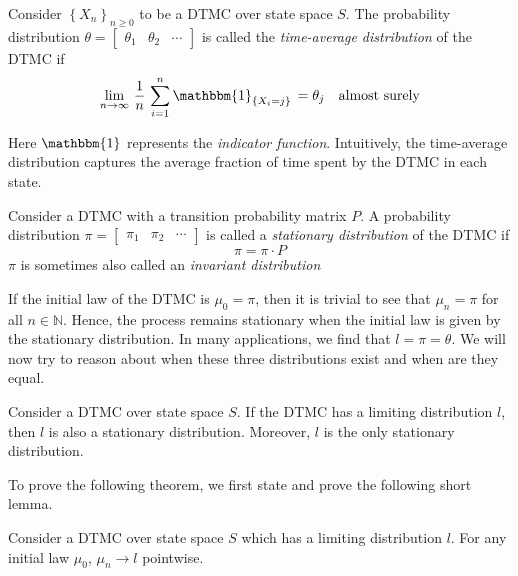 \documentclass[12pt]{article}
\theoremstyle{definition}
\begin{document}
\begin{defn}
    Consider $\left\{ X_n \right\}_{n \geq 0}$ to be a DTMC over state space $S$. The probability distribution $\theta = \begin{bmatrix}
        \theta_1 & \theta_2 & \cdots
    \end{bmatrix}$ is called the \emph{time-average distribution} of the DTMC if
    \[
        \lim_{n \to \infty} \, \frac{1}{n} \, \sum_{i = 1}^{n} \mathbbm{1}_{\left\{X_i = j\right\}} \, = \theta_j \quad \text{almost surely}
    \]
\end{defn}

Here $\mathbbm{1}$ represents the \emph{indicator function}. Intuitively, the time-average distribution captures the average fraction of time spent by the DTMC in each state.

\begin{defn}
    Consider a DTMC with a transition probability matrix $P$. A probability distribution $\pi = \begin{bmatrix}
        \pi_1 & \pi_2 & \cdots
    \end{bmatrix}$ is called a \emph{stationary distribution} of the DTMC if 
    \[
        \pi = \pi \cdot P
    \]
    $\pi$ is sometimes also called an \emph{invariant distribution}
\end{defn}

If the initial law of the DTMC is $\mu_0 = \pi$, then it is trivial to see that $\mu_n = \pi$ for all $n \in \mathbb{N}$. Hence, the process remains stationary when the initial law is given by the stationary distribution. In many applications, we find that $l = \pi = \theta$. We will now try to reason about when these three distributions exist and when are they equal. 

\begin{thm} \label{thm:limstat}
    Consider a DTMC over state space $S$. If the DTMC has a limiting distribution $l$, then $l$ is also a stationary distribution. Moreover, $l$ is the only stationary distribution.
\end{thm}

To prove the following theorem, we first state and prove the following short lemma. 

\begin{lem} \label{lem:lim}
    Consider a DTMC over state space $S$ which has a limiting distribution $l$. For any initial law $\mu_0$, $\mu_n \to l$ pointwise.
\end{lem}
\end{document}

